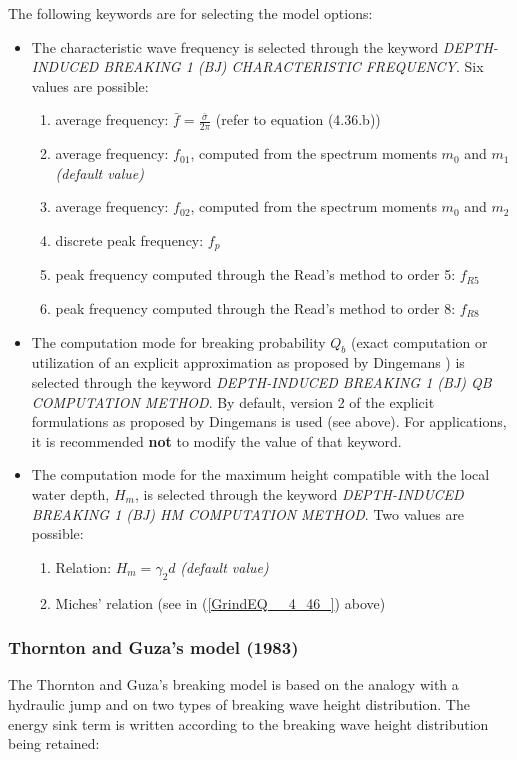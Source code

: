  The following keywords are for selecting the model options:

 \begin{itemize}
 \item The characteristic wave frequency is selected through the keyword
   \textit{DEPTH-INDUCED BREAKING 1 (BJ) CHARACTERISTIC FREQUENCY}. Six values
   are possible:
\begin{enumerate}
\item average frequency: $\bar{f}=\frac{\bar{\sigma }}{2\pi } $  (refer to
  equation (4.36.b))
\item average frequency: $f_{01} $, computed from the spectrum moments $m_0$
  and $m_1$ \textit{(default value)}
\item average frequency: $f_{02} $, computed from the spectrum moments $m_0$
  and $m_2$
 \item discrete peak frequency: $f_p$
 \item peak frequency computed through the Read's method to order 5: $f_{R5}$
 \item peak frequency computed through the Read's method to order 8: $f_{R8}$
\end{enumerate}

\item The computation mode for breaking probability $Q_b $ (exact
  computation or utilization of an explicit approximation as proposed by
  Dingemans \cite{Dingemans1983}) is selected through the keyword
  \textit{DEPTH-INDUCED BREAKING 1 (BJ) QB COMPUTATION METHOD}. By default,
  version 2 of the explicit formulations as proposed by Dingemans is used
  (see above). For applications, it is recommended \textbf{not} to modify the
  value of that keyword.

\item The computation mode for the maximum height compatible with the local
  water depth, $H_m$, is selected through the keyword \textit{DEPTH-INDUCED
    BREAKING 1 (BJ) HM COMPUTATION METHOD}. Two values are possible:
\begin{enumerate}
 \item Relation: $H_{m} =\gamma_2 d$  \textit{(default value)}
 \item Miches' relation (see in (\ref{GrindEQ__4_46_}) above)
\end{enumerate}
\end{itemize}

\subsubsection{Thornton and Guza's model (1983)}
\label{parag4.3.5.2}
The Thornton and Guza's breaking model \cite{Thornton1983} is based on the
analogy with a hydraulic jump and on two types of breaking wave height
distribution. The energy sink term is written according to the breaking wave
height distribution being retained:

